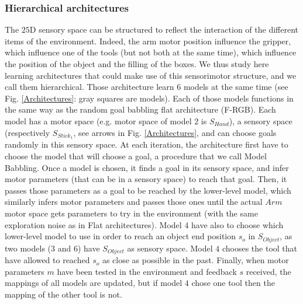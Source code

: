 \documentclass[10pt,letterpaper]{article}
\begin{document}
				
		
		\subsubsection{Hierarchical architectures}
			
			The $25$D sensory space can be structured to reflect the interaction of the different items of the environment.
			Indeed, the arm motor position influence the gripper, which influence one of the tools (but not both at the same time), which influence the position of the object and the filling of the boxes.
			We thus study here learning architectures that could make use of this sensorimotor structure, and we call them hierarchical.
			Those architecture learn $6$ models at the same time (see Fig. \ref{Architectures}: gray squares are models). 
			Each of those models functions in the same way as the random goal babbling flat architecture (F-RGB). 
			Each model has a motor space (e.g. motor space of model $2$ is $S_{Hand}$), a sensory space (respectively $S_{Stick_1}$, see arrows in Fig. \ref{Architectures}, and can choose goals randomly in this sensory space.
			At each iteration, the architecture first have to choose the model that will choose a goal, a procedure that we call Model Babbling.
			Once a model is chosen, it finds a goal in its sensory space, and infer motor parameters (that can be in a sensory space) to reach that goal.
			Then, it passes those parameters as a goal to be reached by the lower-level model, 
			which similarly infers motor parameters and passes those ones until the actual $Arm$ motor space gets parameters to try in the environment (with the same exploration noise as in Flat architectures).
			Model $4$ have also to choose which lower-level model to use in order to reach an object end position $s_o$ in $S_{Object}$, as two models ($3$ and $6$) have $S_{Object}$ as sensory space. 
			Model $4$ chooses the tool that have allowed to reached $s_o$ as close as possible in the past.
			Finally, when motor parameters $m$ have been tested in the environment and feedback $s$ received, the mappings of all models are updated, but if model $4$ chose one tool then the mapping of the other tool is not.
			
\end{document}
